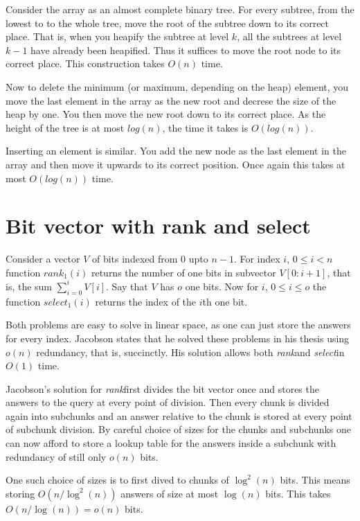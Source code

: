 \documentclass[11pt]{article}
\newcommand{\bigo}{O}
\newcommand{\smallo}{o}
\newcommand{\rank}{\textit{rank}}
\newcommand{\select}{\textit{select}}
\begin{document}
Consider the array as an almost complete binary tree. For every
subtree, from the lowest to to the whole tree, move the root of the
subtree down to its correct place. That is, when you heapify the
subtree at level $k$, all the subtrees at level $k-1$ have already
been heapified. Thus it suffices to move the root node to its correct
place. This construction takes $\bigo(n)$ time.

Now to delete the minimum (or maximum, depending on the heap) element,
you move the last element in the array as the new root and decrese the
size of the heap by one. You then move the new root down to its
correct place. As the height of the tree is at most $log(n)$, the time
it takes is $\bigo(log(n))$.

Inserting an element is similar. You add the new node as the last
element in the array and then move it upwards to its correct position.
Once again this takes at most $\bigo(log(n))$ time.

\section{Bit vector with rank and select}

Consider a vector $V$ of bits indexed from $0$ upto $n-1$. For index
$i$, $0 \le i < n$ function $\rank_1(i)$ returns the number of one
bits in subvector $V[0:i+1]$, that is, the sum $\sum_{i=0}^{i} V[i]$.
Say that $V$ has $o$ one bits. Now for $i$, $0 \le i \le o$ the
function $\select_1(i)$ returns the index of the $i$th one bit.

Both problems are easy to solve in linear space, as one can just store
the answers for every index. Jacobson states \cite{jacobson89} that he
solved these problems in his thesis \cite{jacobson88} using
$\smallo(n)$ redundancy, that is, succinctly. His solution allows both
\rank and \select in $\bigo(1)$ time.

Jacobson's solution for \rank first divides the bit vector once and
stores the answers to the query at every point of division. Then every
chunk is divided again into subchunks and an answer relative to the
chunk is stored at every point of subchunk division. By careful choice
of sizes for the chunks and subchunks one can now afford to store a
lookup table for the answers inside a subchunk with redundancy of
still only $\smallo(n)$ bits.

One such choice of sizes is to first dived to chunks of $\log^2(n)$
bits. This means storing $\bigo(n / \log^2(n))$ answers of size at
most $\log(n)$ bits. This takes $\bigo(n / \log(n)) = \smallo(n)$
bits.
\end{document}
